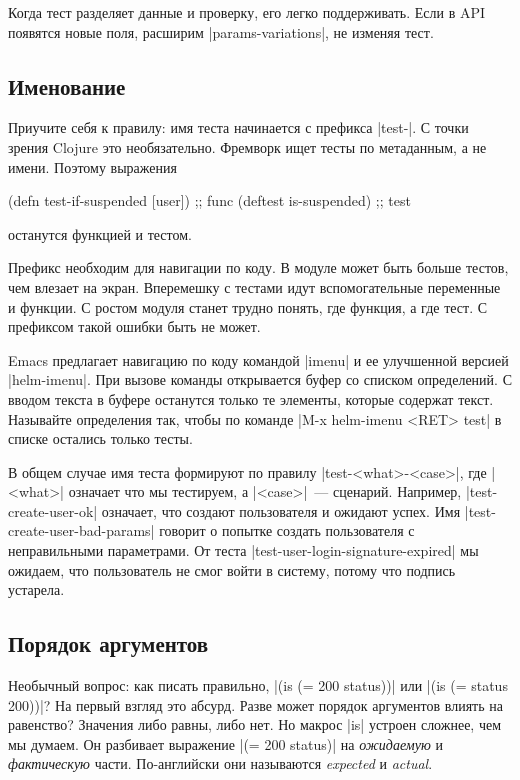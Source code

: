 Когда тест разделяет данные и проверку, его легко поддерживать. Если в API
появятся новые поля, расширим \spverb|params-variations|, не изменяя тест.

\subsection{Именование}

Приучите себя к правилу: имя теста начинается с префикса \spverb|test-|. С точки
зрения Clojure это необязательно. Фремворк ищет тесты по метаданным, а не
имени. Поэтому выражения

\begin{english}
  \begin{clojure}
(defn test-if-suspended [user]) ;; func
(deftest is-suspended)          ;; test
  \end{clojure}
\end{english}

\noindent
останутся функцией и тестом.

Префикс необходим для навигации по коду. В модуле может быть больше тестов, чем
влезает на экран. Вперемешку с тестами идут вспомогательные переменные и
функции. С ростом модуля станет трудно понять, где функция, а где тест. С
префиксом такой ошибки быть не может.

Emacs предлагает навигацию по коду командой \spverb|imenu| и ее улучшенной
версией \spverb|helm-imenu|. При вызове команды открывается буфер со списком
определений. С вводом текста в буфере останутся только те элементы, которые
содержат текст. Называйте определения так, чтобы по команде
\spverb|M-x helm-imenu <RET> test| в списке остались только тесты.

В общем случае имя теста формируют по правилу \spverb|test-<what>-<case>|, где
\spverb|<what>| означает что мы тестируем, а \spverb|<case>|~---
сценарий. Например, \spverb|test-create-user-ok| означает, что создают
пользователя и ожидают успех. Имя \spverb|test-create-user-bad-params| говорит о
попытке создать пользователя с неправильными параметрами. От теста
\spverb|test-user-login-signature-expired| мы ожидаем, что пользователь не смог
войти в систему, потому что подпись устарела.

\subsection{Порядок аргументов}

Необычный вопрос: как писать правильно, \spverb|(is (= 200 status))| или
\spverb|(is (= status 200))|? На первый взгляд это абсурд. Разве может порядок
аргументов влиять на равенство? Значения либо равны, либо нет. Но макрос
\spverb|is| устроен сложнее, чем мы думаем. Он разбивает выражение \spverb|(= 200 status)|
на \emph{ожидаемую} и \emph{фактическую} части. По-английски они называются
 \emph{expected} и \emph{actual}.


